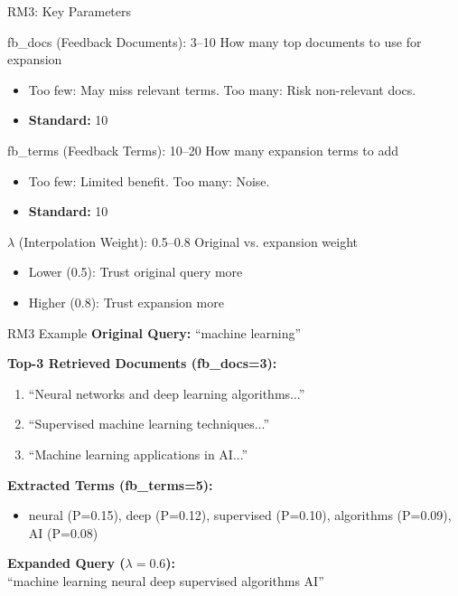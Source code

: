 \documentclass[aspectratio=169]{beamer}
\begin{document}
\begin{frame}[shrink=5]{RM3: Key Parameters}
\begin{block}{fb\_docs (Feedback Documents): 3--10}
How many top documents to use for expansion
\begin{itemize}
    \item Too few: May miss relevant terms. Too many: Risk non-relevant docs.
    \item \textbf{Standard:} 10
\end{itemize}
\end{block}

\begin{block}{fb\_terms (Feedback Terms): 10--20}
How many expansion terms to add
\begin{itemize}
    \item Too few: Limited benefit. Too many: Noise.
    \item \textbf{Standard:} 10
\end{itemize}
\end{block}

\begin{block}{$\lambda$ (Interpolation Weight): 0.5--0.8}
Original vs. expansion weight
\begin{itemize}
    \item Lower (0.5): Trust original query more
    \item Higher (0.8): Trust expansion more
\end{itemize}
\end{block}
\end{frame}

\begin{frame}[shrink=5]{RM3 Example}
\textbf{Original Query:} ``machine learning''

\vspace{0.5em}

\textbf{Top-3 Retrieved Documents (fb\_docs=3):}
\begin{enumerate}
    \item ``Neural networks and deep learning algorithms...''
    \item ``Supervised machine learning techniques...''
    \item ``Machine learning applications in AI...''
\end{enumerate}

\vspace{0.5em}

\textbf{Extracted Terms (fb\_terms=5):}
\begin{itemize}
    \item neural (P=0.15), deep (P=0.12), supervised (P=0.10), algorithms (P=0.09), AI (P=0.08)
\end{itemize}

\vspace{0.5em}

\textbf{Expanded Query ($\lambda=0.6$):}
\\
``machine learning neural deep supervised algorithms AI''
\end{frame}
\end{document}

